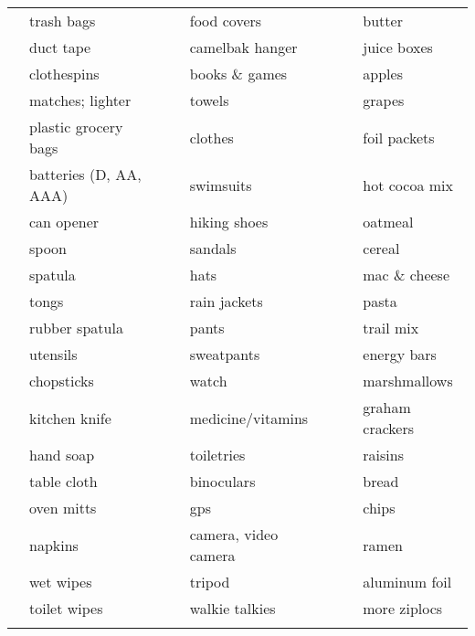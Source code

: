 \documentclass[10pt]{article}
\newcommand{\mybox}{\framebox[4mm]{\textcolor{white} m} \framebox[4mm]{\textcolor{white} m} }
\begin{document}
\begin{tabular}{rlcrlcrl}
\mybox & trash bags             &    &\mybox & food covers          &    &\mybox & butter \\
\mybox & duct tape              &    &\mybox & camelbak hanger      &    &\mybox & juice boxes \\ \cline{4-5}
\mybox & clothespins            &    &\mybox & books \& games       &    &\mybox & apples \\
\mybox & matches; lighter       &    &\mybox & towels               &    &\mybox & grapes \\
\mybox & plastic grocery bags   &    &\mybox & clothes              &    &\mybox & foil packets \\ \cline{7-8}
\mybox & batteries (D, AA, AAA) &    &\mybox & swimsuits            &    &\mybox & hot cocoa mix \\ \cline{1-2}
\mybox & can opener             &    &\mybox & hiking shoes         &    &\mybox & oatmeal \\
\mybox & spoon                  &    &\mybox & sandals              &    &\mybox & cereal \\
\mybox & spatula                &    &\mybox & hats                 &    &\mybox & mac \& cheese \\
\mybox & tongs                  &    &\mybox & rain jackets         &    &\mybox & pasta \\
\mybox & rubber spatula         &    &\mybox & pants                &    &\mybox & trail mix \\
\mybox & utensils               &    &\mybox & sweatpants           &    &\mybox & energy bars \\
\mybox & chopsticks             &    &\mybox & watch                &    &\mybox & marshmallows \\
\mybox & kitchen knife          &    &\mybox & medicine/vitamins    &    &\mybox & graham crackers \\
\mybox & hand soap              &    &\mybox & toiletries           &    &\mybox & raisins \\
\mybox & table cloth            &    &\mybox & binoculars           &    &\mybox & bread \\ \cline{4-5}
\mybox & oven mitts             &    &\mybox & gps                  &    &\mybox & chips \\
\mybox & napkins                &    &\mybox & camera, video camera &    &\mybox & ramen \\
\mybox & wet wipes              &    &\mybox & tripod               &    &\mybox & aluminum foil \\
\mybox & toilet wipes           &    &\mybox & walkie talkies       &    &\mybox & more ziplocs \\
\mybox & \hspace{1.5in}         &    &\mybox & \hspace{1.5in}       &    &\mybox & \hspace{1.5in} \\ \hline
\end{tabular} 
\end{document}
